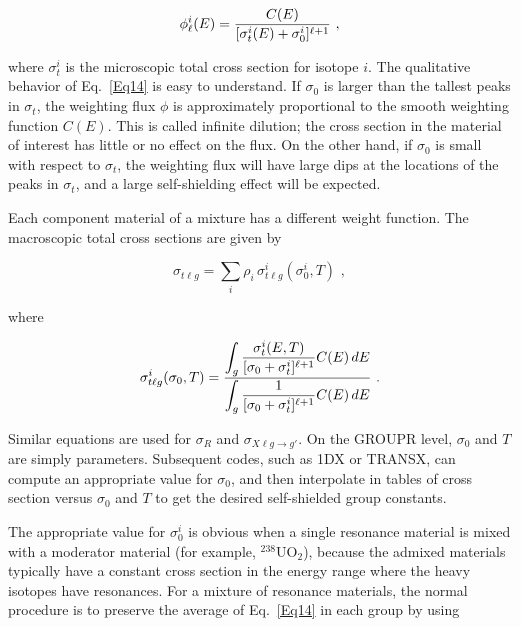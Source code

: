    \begin{equation}
    \phi_{\ell}^i(E)={{C(E)}\over
    {[\sigma_t^i(E)+\sigma_0^i]^{\ell+1}}} \,\,,
  \label{Eq14}
  \end{equation}

\noindent
where $\sigma_t^i$ is the microscopic total cross section for isotope $i$.
The qualitative behavior of Eq.~\ref{Eq14} is easy to understand.
If $\sigma_0$ is larger than the tallest peaks in $\sigma_t$, the weighting
flux $\phi$ is approximately proportional to the smooth weighting function
$C(E)$.  This is called infinite dilution;
 the cross section in the material of interest has little or no effect
on the flux.  On the other hand, if $\sigma_0$ is small with respect
to $\sigma_t$, the weighting flux will have large dips at the locations
of the peaks in $\sigma_t$, and a large self-shielding effect will
be expected.

Each component material of a mixture has a different weight function.
The macroscopic total cross sections are given by

  \begin{equation}
    \sigma_{t\ell g}=\sum_i \rho_i \,\sigma_{t\ell g}^i(\sigma_0^i,T)\,\,,
  \end{equation}

\noindent
where

  \begin{equation}
    \sigma_{t\ell g}^i(\sigma_0,T)=
    {{\displaystyle\int_g {{\sigma_t^i(E,T)}\over
    {[\sigma_0+\sigma_t^i]^{\ell+1}}}
    C(E)\,dE}\over
    {\displaystyle\int_g{{1}\over
    {[\sigma_0+\sigma_t^i]^{\ell+1}}} C(E)\,dE}}\,\,.
  \end{equation}

\noindent
Similar equations are used for $\sigma_R$ and $\sigma_{X\ell g\rightarrow g'}$.
On the GROUPR level, $\sigma_0$ and $T$ are simply parameters.  Subsequent
codes, such as 1DX\cite{1DX} or TRANSX\cite{TRANSX,TRANSX2},
 can compute an appropriate value for $\sigma_0$, and then
interpolate in tables of cross section versus $\sigma_0$ and $T$ to get
the desired self-shielded group constants.

The appropriate value for $\sigma_0^i$ is obvious
when a single resonance material is mixed with a moderator material
(for example, $^{238}$UO$_2$), because the admixed materials typically
have a constant cross section in the energy range where the heavy isotopes
have resonances.  For a mixture of resonance materials, the normal procedure
is to preserve the average of Eq.~\ref{Eq14} in each group by using

